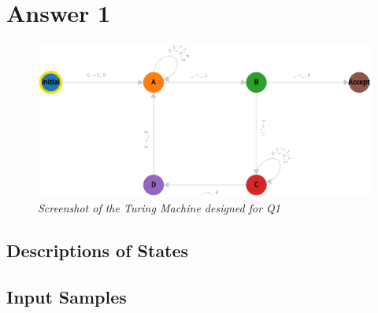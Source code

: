 \section*{Answer 1}
\label{answer-1}

\begin{figure}[ht] %
  \centering
  \includegraphics[width=\linewidth]{answers/img/q1-machine.png}
  \caption{\textit{Screenshot of the Turing Machine designed for Q1}}
  \label{fig:q1-machine}
\end{figure}

\begin{center} \subsection*{Descriptions of States} \end{center}
\label{q1:description-of-states}



\newpage 

\begin{center} \subsection*{Input Samples} \end{center}
\label{q1:input-samples}










